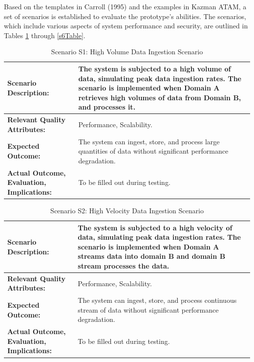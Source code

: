 \documentclass[journal]{IEEEtran}
\begin{document}
Based on the templates in Carroll (1995) and the examples in Kazman ATAM, a set of scenarios is established to evaluate the prototype's abilities. The scenarios, which include various aspects of system performance and security, are outlined in Tables \ref{s1Table} through \ref{s6Table}.

\begin{table}[tbp]
  \caption{Scenario S1: High Volume Data Ingestion Scenario}
  \begin{tabularx}{\textwidth}{|>{\raggedright\arraybackslash}p{5cm}|X|}
  \hline
  \textbf{Scenario Description:} & The system is subjected to a high volume of data, simulating peak data ingestion rates. The scenario is implemented when Domain A retrieves high volumes of data from Domain B, and processes it.  \\
  \hline
  \textbf{Relevant Quality Attributes:} & Performance, Scalability. \\
  \hline
  \textbf{Expected Outcome:} & The system can ingest, store, and process large quantities of data without significant performance degradation. \\
  \hline
  \textbf{Actual Outcome, Evaluation, Implications:} & To be filled out during testing. \\
  \hline
  \end{tabularx}
  \label{s1Table}
\end{table}

\begin{table}[tbp]
  \caption{Scenario S2: High Velocity Data Ingestion Scenario}
  \begin{tabularx}{\textwidth}{|>{\raggedright\arraybackslash}p{5cm}|X|}
  \hline
  \textbf{Scenario Description:} & The system is subjected to a high velocity of data, simulating peak data ingestion rates. The scenario is implemented when Domain A streams data into domain B and domain B stream processes the data.    \\
  \hline
  \textbf{Relevant Quality Attributes:} & Performance, Scalability. \\
  \hline
  \textbf{Expected Outcome:} & The system can ingest, store, and process continuous stream of data without significant performance degradation. \\
  \hline
  \textbf{Actual Outcome, Evaluation, Implications:} & To be filled out during testing. \\
  \hline
  \end{tabularx}
\end{table}
\end{document}
